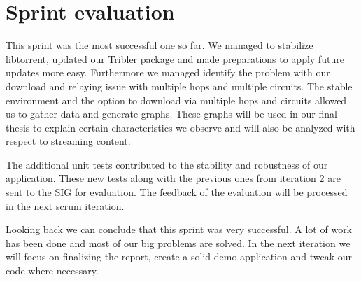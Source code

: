 	\section{Sprint evaluation}
		This sprint was the most successful one so far. We managed to stabilize libtorrent, updated our Tribler package and made preparations to apply future updates more easy. Furthermore we managed identify the problem with our download and relaying issue with multiple hops and multiple circuits. The stable environment and the option to download via multiple hops and circuits allowed us to gather data and generate graphs. These graphs will be used in our final thesis to explain certain characteristics we observe and will also be analyzed with respect to streaming content.
		
		The additional unit tests contributed to the stability and robustness of our application. These new tests along with the previous ones from iteration 2 are sent to the SIG for evaluation. The feedback of the evaluation will be processed in the next scrum iteration.
		
		Looking back we can conclude that this sprint was very successful. A lot of work has been done and most of our big problems are solved. In the next iteration we will focus on finalizing the report, create a solid demo application and tweak our code where necessary.

